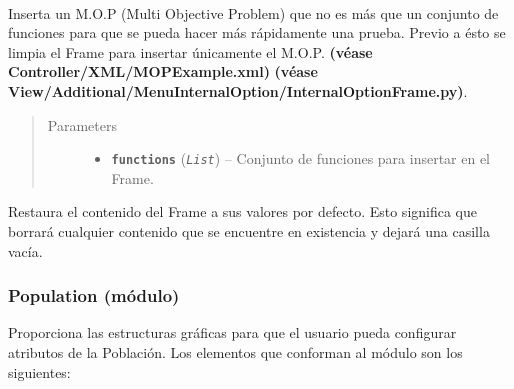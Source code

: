 \documentclass[class=report, crop=false]{standalone}
\begin{document}
\begin{fulllineitems}
\begin{fulllineitems}

~
\vspace{-0.3cm}

Inserta un M.O.P (Multi Objective Problem) que no es más 
que un conjunto de funciones para que se pueda hacer más 
rápidamente una prueba.\break
Previo a ésto se limpia el Frame para insertar únicamente 
el M.O.P.\break
\textbf{(véase Controller/XML/MOPExample.xml)}\break
\textbf{(véase View/Additional/MenuInternalOption/InternalOptionFrame.py)}.

\begin{quote}\begin{description}
\item[{Parameters}] \leavevmode\begin{itemize}
\item \textbf{\texttt{functions}} (\emph{\texttt{List}}) -- Conjunto de funciones para insertar en el Frame.
\end{itemize}
\end{description}\end{quote}

\end{fulllineitems}

\begin{fulllineitems}

Restaura el contenido del Frame a sus valores por 
defecto.\break
Esto significa que borrará cualquier contenido que se 
encuentre en existencia y dejará una casilla vacía.

\end{fulllineitems}

\end{fulllineitems}

\subsubsection{Population (módulo)}
\label{sec:a_3_2_4}
Proporciona las estructuras gráficas para que el usuario 
pueda configurar atributos de la Población.\break
Los elementos que conforman al módulo son los siguientes:
\end{document}
